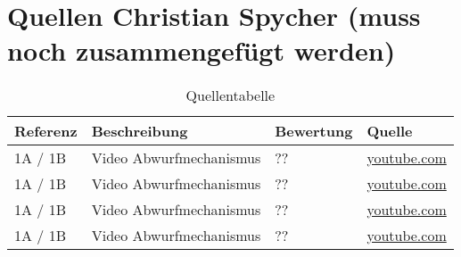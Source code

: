 \section{Quellen Christian Spycher (muss noch zusammengefügt werden)}

\begin{table}[h!]
	\centering
	\begin{tabular}{l l l l}
		Referenz & Beschreibung & Bewertung & Quelle \\
		\hline
        
        1A / 1B & Video Abwurfmechanismus & ?? & \href{http://www.youtube.com/watch?v=ehrB93rbLoM}{youtube.com} \\
        
         1A / 1B & Video Abwurfmechanismus & ?? & \href{http://www.youtube.com/watch?v=Za3fQ1TSFrY}{youtube.com} \\
         
          1A / 1B & Video Abwurfmechanismus & ?? & \href{http://www.youtube.com/watch?v=MSjCmDsDnNU}{youtube.com} \\
          
          1A / 1B & Video Abwurfmechanismus & ?? & \href{http://www.youtube.com/watch?v=oZjx7F1doGs}{youtube.com} \\
          
          
        
        
        
	\end{tabular}
	\caption{Quellentabelle}
	\label{tab:quelle}
\end{table}
